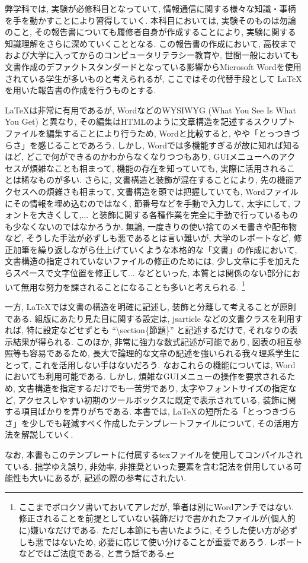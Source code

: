 

弊学科では, 実験が必修科目となっていて, 情報通信に関する様々な知識・事柄を手を動かすことにより習得していく.
本科目においては, 実験そのものは勿論のこと, その報告書についても履修者自身が作成することにより, 実験に関する知識理解をさらに深めていくこととなる.
この報告書の作成において, 高校までおよび大学に入ってからのコンピュータリテラシー教育や, 世間一般においても文書作成のデファクトスタンダードとなっている影響からMicrosoft Wordを使用されている学生が多いものと考えられるが,
ここではその代替手段として \LaTeX を用いた報告書の作成を行うものとする.

\LaTeX は非常に有用であるが, WordなどのWYSIWYG (What You See Is What You Get) と異なり,
その編集はHTMLのように文章構造を記述するスクリプトファイルを編集することにより行うため, Wordと比較すると, やや「とっつきづらさ」を感じることであろう.
しかし, Wordでは多機能すぎるが故に知れば知るほど, どこで何ができるのかわからなくなりつつもあり, GUIメニューへのアクセスが煩雑なことも相まって, 機能の存在を知っていても, 実際に活用されることは稀なものが多い.
さらに, 文書構造と装飾が混在することにより, 先の機能アクセスへの煩雑さも相まって, 文書構造を頭では把握していても, Wordファイルにその情報を埋め込むのではなく, 節番号などを手動で入力して,
太字にして, フォントを大きくして,... と装飾に関する各種作業を完全に手動で行っているものも少なくないのではなかろうか.
無論, 一度きりの使い捨てのメモ書きや配布物など, そうした手法が必ずしも悪であるとは言い難いが, 大学のレポートなど, 修正加筆を繰り返しながら仕上げていくような本格的な「文書」の作成において,
文書構造の指定されていないファイルの修正のためには, 少し文章に手を加えたらスペースで文字位置を修正して... などといった, 本質とは関係のない部分において無用な努力を課されることになることも多いと考えられる.
\footnote{
    ここまでボロクソ書いておいてアレだが, 筆者は別にWordアンチではない. 修正されることを前提としていない装飾だけで書かれたファイルが(個人的に)嫌いなだけである.
    ただし本節にも書いたように, そうした使い方が必ずしも悪ではないため, 必要に応じて使い分けることが重要であろう. レポートなどではご法度である, と言う話である.
}

一方, \LaTeX では文書の構造を明確に記述し, 装飾と分離して考えることが原則である.
組版にあたり見た目に関する設定は, jsarticle などの文書クラスを利用すれば, 特に設定などせずとも ``\textbackslash section\{節題\}'' と記述するだけで, それなりの表示結果が得られる.
このほか, 非常に強力な数式記述が可能であり, 図表の相互参照等も容易であるため, 長大で論理的な文章の記述を強いられる我々理系学生にとって, これを活用しない手はないだろう.
なおこれらの機能については, Word においても利用可能である. しかし, 煩雑なGUIメニューの操作を要求されるため, 文書構造を指定するだけでも一苦労であり, 太字やフォントサイズの指定など,
アクセスしやすい初期のツールボックスに既定で表示されている, 装飾に関する項目ばかりを弄りがちである.
本書では, \LaTeX の短所たる「とっつきづらさ」を少しでも軽減すべく作成したテンプレートファイルについて, その活用方法を解説していく.

なお, 本書もこのテンプレートに付属するtexファイルを使用してコンパイルされている. 拙学ゆえ誤り, 非効率, 非推奨といった要素を含む記法を併用している可能性も大いにあるが, 記述の際の参考にされたい.
